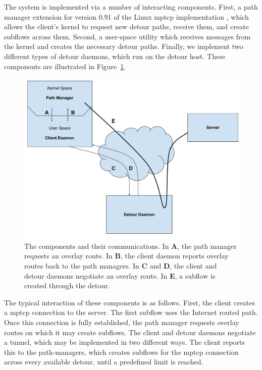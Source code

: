 \documentclass{cwru}
\begin{document}
The system is implemented via a number of interacting components. First, a path
manager extension for version 0.91 of the Linux \ac{mptcp} implementation
\cite{mptcp}, which allows the client's kernel to request new detour paths,
receive them, and create subflows across them. Second, a user-space utility
which receives messages from the kernel and creates the necessary detour paths.
Finally, we implement two different types of detour daemons, which run on the
detour host. These components are illustrated in Figure~\ref{f:MovingParts}.

\begin{figure}[h]
  \centering
  \includegraphics[width=\textwidth]{figures/MovingParts.pdf}
  \caption[Interaction of client, detour, and server]{
    The components and their communications. In \textbf{A}, the path manager
    requests an overlay route. In \textbf{B}, the client daemon reports overlay
    routes back to the path managers. In \textbf{C} and \textbf{D}, the client
    and detour daemons negotiate an overlay route. In \textbf{E}, a subflow is
    created through the detour.
  }
  \label{f:MovingParts}
\end{figure}

The typical interaction of these components is as follows. First, the client
creates a \ac{mptcp} connection to the server. The first subflow uses the Internet
routed path. Once this connection is fully established, the path manager
requests overlay routes on which it may create subflows. The client and detour
daemons negotiate a tunnel, which may be implemented in two different ways. The
client reports this to the path-managers, which creates subflows for the \ac{mptcp}
connection across every available detour, until a predefined limit is reached.
\end{document}
